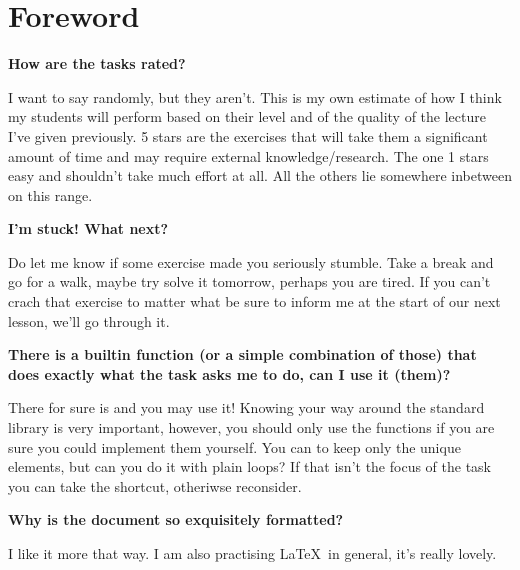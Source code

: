 



\setcounter{section}{-1}
\section{Foreword}

\begin{flushleft}
\textbf{How are the tasks rated?}
\end{flushleft}
\begin{flushright}
I want to say randomly, but they aren't. This is my own estimate of how I think
my students will perform based on their level and of the quality of the lecture
I've given previously. 5 stars are the exercises that will take them a
significant amount of time and may require external knowledge/research.
The one 1 stars easy and shouldn't take much effort at all. All the others lie 
somewhere inbetween on this range.
\end{flushright}

\begin{flushleft}
\textbf{I'm stuck! What next?}
\end{flushleft}
\begin{flushright}
Do let me know if some exercise made you seriously stumble. Take a break and
go for a walk, maybe try solve it tomorrow, perhaps you are tired. If you can't
crach that exercise to matter what be sure to inform me at the start of our
next lesson, we'll go through it.
\end{flushright}

\begin{flushleft}
\textbf{There is a builtin function (or a simple combination of those) that does
exactly what the task asks me to do, can I use it (them)?}
\end{flushleft}
\begin{flushright}
There for sure is and you may use it! Knowing your way around the standard library
is very important, however, you should only use the functions if you are sure
you could implement them yourself. You can \hbox{} to 
keep only the unique elements, but can you do it with plain  loops? If 
that isn't the focus of the task you can take the shortcut, otheriwse reconsider.
\end{flushright}

\begin{flushleft}
\textbf{Why is the document so exquisitely formatted?}
\end{flushleft}
\begin{flushright}
I like it more that way. I am also practising \LaTeX\ in general,
it's really lovely.
\end{flushright}


